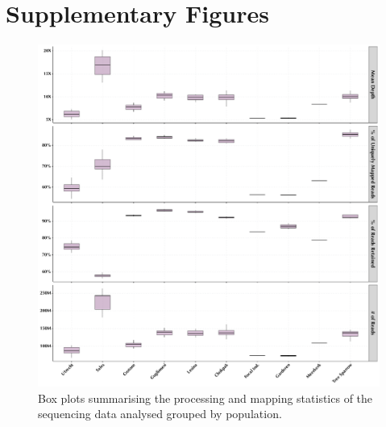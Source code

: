 \chapter{Supplementary Figures}
\label{cp:02-Figures-SI}

\begin{figure}[!htpb]
    \centering
    \includegraphics[width=\linewidth]{Figures/Y150239Genomics--Stats.pdf}
    \caption{Box plots summarising the processing and mapping statistics of the sequencing data analysed grouped by population.}
    \label{fig:SIfigure-01}
\end{figure}

